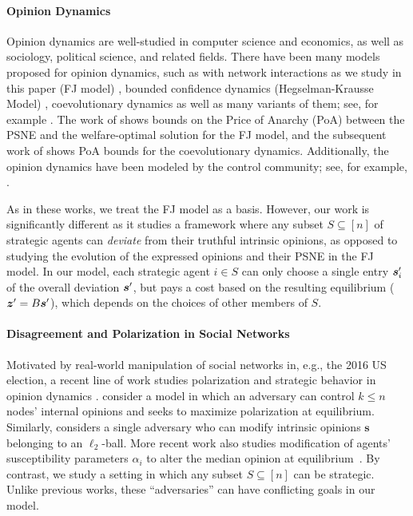 \paragraph{Opinion Dynamics} Opinion dynamics are well-studied in computer science and economics, as well as sociology, political science, and related fields. There have been many models proposed for opinion dynamics, such as with network interactions as we study in this paper (FJ model) \citep{Friedkin1990,Bindel2015}, bounded confidence dynamics (Hegselman-Krausse Model) \citep{hegselmann2002opinion}, coevolutionary dynamics \citep{bhawalkar2013} as well as many variants of them; see, for example \citet{abebe2018opinion,hazla2019geometric,fotakis2016opinion,fotakis2023opinion,tsourakakis-2024}. The work of \citep{bindel2011} shows bounds on the Price of Anarchy (PoA) between the PSNE and the welfare-optimal solution for the FJ model, and the subsequent work of \cite{bhawalkar2013} shows PoA bounds for the coevolutionary dynamics. Additionally, the opinion dynamics have been modeled by the control community; see, for example, \citep{nedic2012,de2022,bhattacharyya2013convergence,chazelle2011total}. 

As in these works, we treat the FJ model as a basis. However, our work is significantly different as it studies a framework where any subset $S \subseteq [n]$ of strategic agents can {\em deviate} from their truthful intrinsic opinions, as opposed to studying the evolution of the expressed opinions and their PSNE in the FJ model. In our model, each strategic agent $i \in S$ can only choose a single entry $\bm{s}_i^\prime$ of the overall deviation $\bm{s}^\prime$, but pays a cost based on the resulting equilibrium ($\bm{z}^\prime = B \bm{s}^\prime$), which depends on the choices of other members of $S$. 

\paragraph{Disagreement and Polarization in Social Networks} Motivated by real-world manipulation of social networks in, e.g., the 2016 US election, a recent line of work studies polarization and strategic behavior in opinion dynamics \cite{gaitonde2020adversarial,gaitonde2021polarization,Chen2022,wang2024relationship,tsourakakis-2024,ristache2025countering}. 
\citet{Chen2022} consider a model in which an adversary can control $k \leq n$ nodes' internal opinions and seeks to maximize polarization at equilibrium. Similarly, \citet{gaitonde2020adversarial} considers a single adversary who can modify intrinsic opinions $\bm{s}$ belonging to an $\ell_2$-ball. More recent work also studies modification of agents' susceptibility parameters $\alpha_i$ to alter the median opinion at equilibrium~\cite{ristache2025countering}. By contrast, we study a setting in which any subset $S \subseteq [n]$ can be strategic. Unlike previous works, these ``adversaries'' can have conflicting goals in our model.

